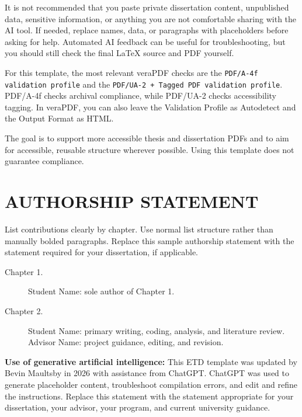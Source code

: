 \begin{acknowledgements}
It is not recommended that you paste private dissertation content, unpublished data, sensitive information, or anything you are not comfortable sharing with the AI tool. If needed, replace names, data, or paragraphs with placeholders before asking for help. Automated AI feedback can be useful for troubleshooting, but you should still check the final LaTeX source and PDF yourself.

For this template, the most relevant veraPDF checks are the \texttt{PDF/A-4f validation profile} and the \texttt{PDF/UA-2 + Tagged PDF validation profile}. PDF/A-4f checks archival compliance, while PDF/UA-2 checks accessibility tagging. In veraPDF, you can also leave the Validation Profile as Autodetect and the Output Format as HTML.

The goal is to support more accessible thesis and dissertation PDFs and to aim for accessible, reusable structure wherever possible. Using this template does not guarantee compliance.

\end{acknowledgements}

\thesistableofcontents
\thesislistoftables
\thesislistoffigures

\chapter*{AUTHORSHIP STATEMENT}

List contributions clearly by chapter. Use normal list structure rather than manually bolded paragraphs. Replace this sample authorship statement with the statement required for your dissertation, if applicable.

\begin{description}
  \item[Chapter 1.] Student Name: sole author of Chapter 1.
  \item[Chapter 2.] Student Name: primary writing, coding, analysis, and literature review. Advisor Name: project guidance, editing, and revision.
\end{description}

\vskip 1cm

\noindent\textbf{Use of generative artificial intelligence:} This ETD template was updated by Bevin Maultsby in 2026 with assistance from ChatGPT. ChatGPT was used to generate placeholder content, troubleshoot compilation errors, and edit and refine the instructions. Replace this statement with the statement appropriate for your dissertation, your advisor, your program, and current university guidance.